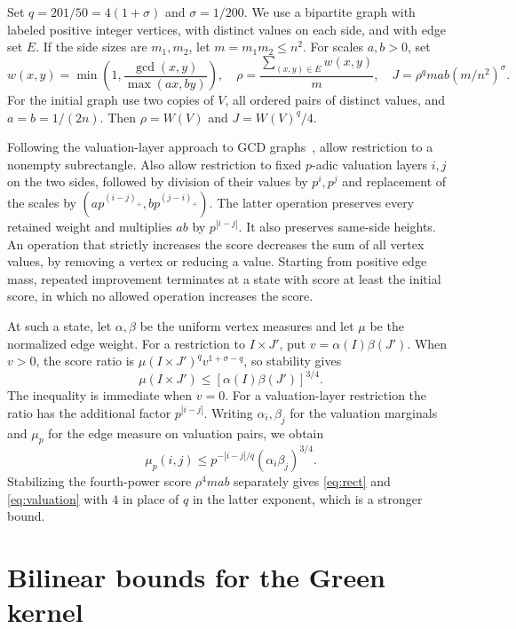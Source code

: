 \documentclass[11pt,a4paper]{article}
\begin{document}
Set \(q=201/50=4(1+\sigma)\) and \(\sigma=1/200\). We use a
bipartite graph with labeled positive integer vertices, with distinct
values on each side, and with edge set \(E\). If the side sizes are
\(m_1,m_2\), let \(m=m_1m_2\le n^2\). For scales \(a,b>0\), set
\[
 w(x,y)=\min\left(1,\frac{\gcd(x,y)}{\max(ax,by)}\right),\quad
 \rho=\frac{\sum_{(x,y)\in E}w(x,y)}m,\quad
 J=\rho^q mab(m/n^2)^\sigma.
\]
For the initial graph use two copies of \(V\), all ordered pairs of
distinct values, and \(a=b=1/(2n)\). Then
\(\rho=W(V)\) and \(J=W(V)^q/4\).

Following the valuation-layer approach to GCD graphs~\cite{GreenWalker,HuJing},
allow restriction to a nonempty subrectangle. Also allow restriction
to fixed \(p\)-adic valuation layers \(i,j\) on the two sides, followed
by division of their values by \(p^i,p^j\) and replacement of the
scales by \((ap^{(i-j)_+},bp^{(j-i)_+})\).
The latter operation preserves every retained weight and multiplies
\(ab\) by \(p^{|i-j|}\). It also preserves same-side heights.
An operation that strictly increases the score decreases the sum of
all vertex values, by removing a vertex or reducing a value. Starting
from positive edge mass, repeated improvement terminates at a state
with score at least the initial score, in which no allowed operation
increases the score.

At such a state, let \(\alpha,\beta\) be the uniform vertex measures
and let \(\mu\) be the normalized edge weight. For a restriction to
\(I\times J'\), put \(v=\alpha(I)\beta(J')\). When \(v>0\), the score
ratio is \(\mu(I\times J')^qv^{1+\sigma-q}\), so stability gives
\begin{equation}
 \mu(I\times J')\le[\alpha(I)\beta(J')]^{3/4}.\tag{L04}\label{eq:rect}
\end{equation}
The inequality is immediate when \(v=0\).
For a valuation-layer restriction the ratio has the additional factor
\(p^{|i-j|}\). Writing \(\alpha_i,\beta_j\) for the valuation marginals
and \(\mu_p\) for the edge measure on valuation pairs, we obtain
\begin{equation}
 \mu_p(i,j)\le p^{-|i-j|/q}(\alpha_i\beta_j)^{3/4}.
 \tag{L05}\label{eq:valuation}
\end{equation}
Stabilizing the fourth-power score \(\rho^4mab\) separately gives
\eqref{eq:rect} and \eqref{eq:valuation} with \(4\) in place of \(q\)
in the latter exponent, which is a stronger bound.

\section{Bilinear bounds for the Green kernel}\label{sec:kernel}
\end{document}
